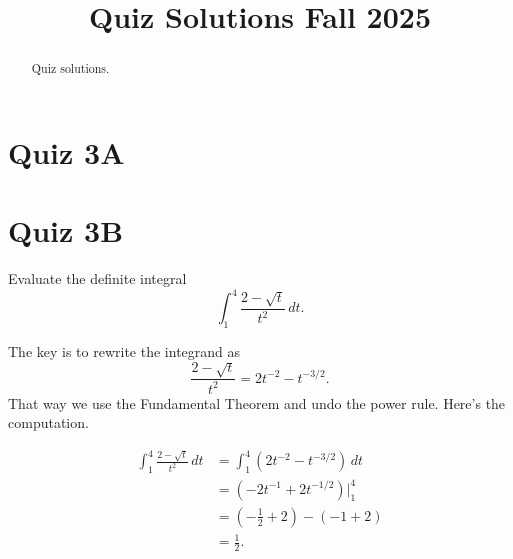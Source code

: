 \documentclass{ximera}
\title{Quiz Solutions Fall 2025}
\begin{document}
\begin{abstract}
Quiz solutions.
\end{abstract}
\maketitle



\section{Quiz 3A}



\section{Quiz 3B}

\begin{question} \label{QKDFefggg}
Evaluate the definite integral
\[
  \int_1^4 \frac{2-\sqrt{t}}{t^2} \, dt.
\]

\begin{explanation}
The key is to rewrite the integrand as
\[
  \frac{2-\sqrt{t}}{t^2} = 2t^{-2} - t^{-3/2} .
\]
That way we use the Fundamental Theorem and undo the power rule. Here's the computation.

\begin{align*}
\int_1^4 \frac{2-\sqrt{t}}{t^2} \, dt  &= \int_1^4 (  2t^{-2} - t^{-3/2}  )\, dt  \\
                                                      &= \left(  -2t^{-1} + 2t^{-1/2}   \right)\Big|_1^4 \\
                                                      &= (-\frac{1}{2} + 2)  -(-1 + 2) \\
                                                       &=\frac{1}{2} .
\end{align*}

\end{explanation}

\end{question}
\end{document}
